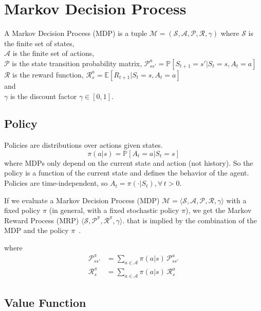 \section{Markov Decision Process}\label{sec:markov-decision-process2}
\begin{definition}
    A Markov Decision Process (MDP) is a tuple $\mathcal{M}=(\mathcal{S},\mathcal{A},\mathcal{P},\mathcal{R},\gamma)$
    where
    $\mathcal{S}$ is the finite set of states, \\
    $\mathcal{A}$ is the finite set of actions, \\
    $\mathcal{P}$ is the state transition probability matrix,
    $\mathcal{P}_{ss'}^{a}=\mathbb{P}[S_{t+1}=s'|S_t=s,A_t=a]$\\
    $\mathcal{R}$ is the reward function, $\mathcal{R}_{s}^{a}=\mathbb{E}[R_{t+1}|S_t=s,A_t=a]$ \\
    and  \\
    $\gamma$ is the discount factor $\gamma\in[0,1]$. \\
\end{definition} %

\subsection{Policy}\label{subsec:policy}
Policies are distributions over actions given states.
\[
    \pi(a|s) = \mathbb{P}[A_t=a|S_t=s]
\]
where MDPs only depend on the current state and action (not history).
So the policy is a function of the current state and defines
the behavior of the agent.
Policies are time-independent, so $A_t=\pi(\cdot|S_t),\forall\,t>0$.


If we evaluate a Markov Decision Process (MDP)
$\mathcal{M}=\langle\mathcal{S},\mathcal{A},\mathcal{P},\mathcal{R},\gamma\rangle$
with a fixed policy $\pi$ (in general, with a fixed stochastic policy $\pi$), we get the
Markov Reward Process (MRP) $\langle \mathcal{S},\mathcal{P}^{\pi},\mathcal{R}^{\pi},\gamma\rangle$.
that is implied by the combination of the MDP and the
policy $\pi$~\cite[100]{rao-2022}.

where
\begin{align}
    \mathcal{P}^{\pi}_{ss'} &= \sum_{a\in\mathcal{A}}^{}\pi(a|s)\,\mathcal{P}_{ss'}^{a} \\
    \mathcal{R}^{\pi}_{s} &= \sum_{a\in\mathcal{A}}^{}\pi(a|s)\,\mathcal{R}_{s}^{a}
\end{align}

\subsection{Value Function}\label{subsec:value-function}

